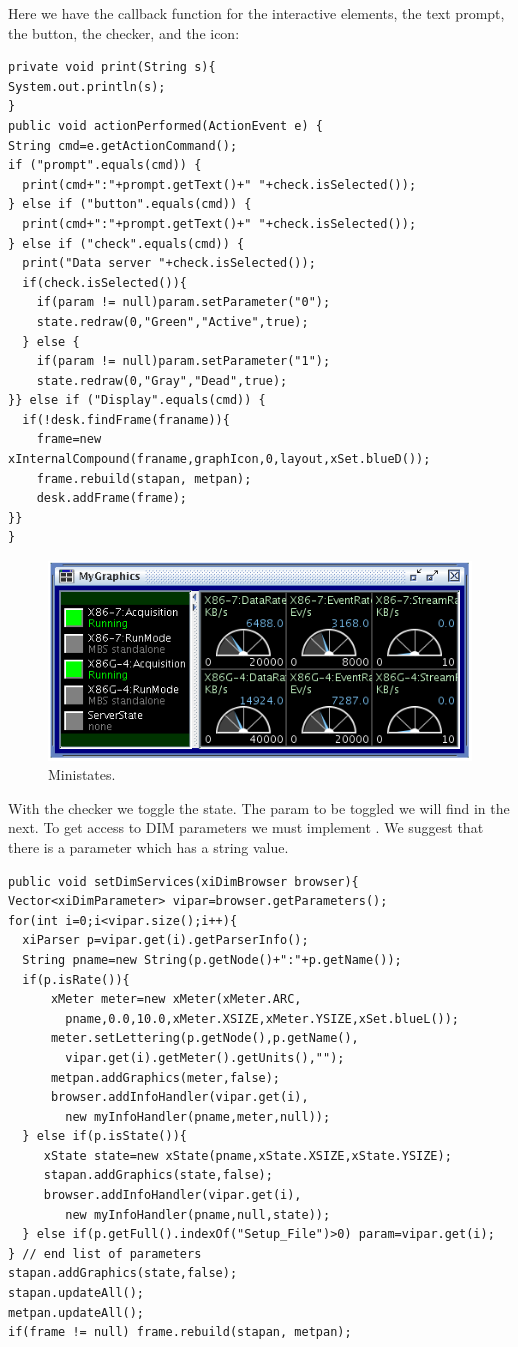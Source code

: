 Here we have the callback function for the interactive elements,
the text prompt, the button, the checker, and the icon:
{\small \begin{verbatim}
private void print(String s){
System.out.println(s);
}
public void actionPerformed(ActionEvent e) {
String cmd=e.getActionCommand();
if ("prompt".equals(cmd)) {
  print(cmd+":"+prompt.getText()+" "+check.isSelected());
} else if ("button".equals(cmd)) {
  print(cmd+":"+prompt.getText()+" "+check.isSelected());
} else if ("check".equals(cmd)) {
  print("Data server "+check.isSelected());
  if(check.isSelected()){
    if(param != null)param.setParameter("0");
    state.redraw(0,"Green","Active",true);
  } else {
    if(param != null)param.setParameter("1");
    state.redraw(0,"Gray","Dead",true);
}} else if ("Display".equals(cmd)) {
  if(!desk.findFrame(franame)){
    frame=new xInternalCompound(franame,graphIcon,0,layout,xSet.blueD());
    frame.rebuild(stapan, metpan); 
    desk.addFrame(frame); 
}}
}
\end{verbatim}
}
\begin{figure}[htb]
\centering\includegraphics[angle=0,width=.7\textwidth]{prog-ministates.png} %
\caption{Ministates.}
\label{fig:prog-ministates} %
\end{figure}
With the checker we toggle the  state.
The  param to be toggled we will find in the next.
To get access to DIM parameters we must implement .
We suggest that there is a parameter  which has a string value.
{\small \begin{verbatim}
public void setDimServices(xiDimBrowser browser){
Vector<xiDimParameter> vipar=browser.getParameters();
for(int i=0;i<vipar.size();i++){
  xiParser p=vipar.get(i).getParserInfo();
  String pname=new String(p.getNode()+":"+p.getName());
  if(p.isRate()){ 
      xMeter meter=new xMeter(xMeter.ARC,
        pname,0.0,10.0,xMeter.XSIZE,xMeter.YSIZE,xSet.blueL());
      meter.setLettering(p.getNode(),p.getName(),
        vipar.get(i).getMeter().getUnits(),"");
      metpan.addGraphics(meter,false); 
      browser.addInfoHandler(vipar.get(i),
        new myInfoHandler(pname,meter,null));
  } else if(p.isState()){ 
     xState state=new xState(pname,xState.XSIZE,xState.YSIZE);
     stapan.addGraphics(state,false);
     browser.addInfoHandler(vipar.get(i),
        new myInfoHandler(pname,null,state));
  } else if(p.getFull().indexOf("Setup_File")>0) param=vipar.get(i);
} // end list of parameters
stapan.addGraphics(state,false);
stapan.updateAll();
metpan.updateAll();
if(frame != null) frame.rebuild(stapan, metpan);
\end{verbatim}
}
